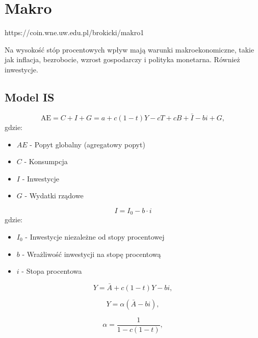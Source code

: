 \section{Makro}
\label{sec:makro}

https://coin.wne.uw.edu.pl/brokicki/makro1%

Na wysokość stóp procentowych wpływ mają warunki makroekonomiczne, takie jak inflacja, bezrobocie, wzrost gospodarczy i polityka monetarna.
Również inwestycje.

\subsection{Model IS}

\begin{equation}
    \mathrm{AE} = C + I + G = a + c(1 - t)Y - c T + c B + \bar{I} - b i + G,
    \end{equation}
gdzie:
\begin{itemize}
    \item \(AE\) - Popyt globalny (agregatowy popyt)
    \item \(C\) - Konsumpcja
    \item \(I\) - Inwestycje
    \item \(G\) - Wydatki rządowe
\end{itemize}


\begin{equation}
    I =  I_0 - b \cdot i
\end{equation}
gdzie:
\begin{itemize}
    \item \(I_0\) - Inwestycje niezależne od stopy procentowej
    \item \(b\) - Wrażliwość inwestycji na stopę procentową
    \item \(i\) - Stopa procentowa
\end{itemize}


\begin{equation}
    Y = \bar{A} + c(1 - t)Y - b i,
    \end{equation}

    \begin{equation}
        Y = \alpha(\bar{A} - b i),
        \end{equation}
        
        \begin{equation}
        \alpha = \frac{1}{1 - c(1 - t)},
        \end{equation}

